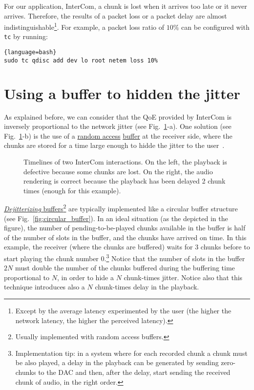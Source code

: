 For our application, InterCom, a chunk is lost when it arrives too
late or it never arrives. Therefore, the results of a packet loss or a
packet delay are almost indistinguishable\footnote{Except by the
  average latency experimented by the user (the higher the network
  latency, the higher the perceived latency).}. For example, a packet
loss ratio of $10\%$ can be configured with \verb|tc| by running:

  \begin{lstlisting}{language=bash}
sudo tc qdisc add dev lo root netem loss 10%
  \end{lstlisting}

\section{Using a buffer to hidden the jitter}

As explained before, we can consider that the QoE provided by InterCom
is inversely proportional to the network jitter (see
Fig.~\ref{fig:timelines}-a). One solution (see
Fig.~\ref{fig:timelines}-b) is the use of a
\href{https://en.wikipedia.org/wiki/Random_access}{random access}
\href{https://en.wikipedia.org/wiki/Data_buffer}{buffer} at the
receiver side, where the chunks are stored for a time large enough to
hidde the jitter to the user~\cite{Kurose-Ross}.

\begin{figure}
  \begin{center}
  \end{center}
  \caption{Timelines of two InterCom interactions. On the left, the
    playback is defective because some chunks are lost. On the right,
    the audio rendering is correct because the playback has been
    delayed 2 chunk times (enough for this example).}
  \label{fig:timelines}
\end{figure}

\href{https://en.wikipedia.org/wiki/Jitter#Jitter_buffers}{\emph{Dejitterizing}
  buffers}\footnote{Usually implemented with random access buffers.}
are typically implemented like a circular buffer structure (see
Fig.~\ref{fig:circular_buffer}). In an ideal situation (as the
depicted in the figure), the number of pending-to-be-played chunks
available in the buffer is half of the number of slots in the buffer,
and the chunks have arrived on time. In this example, the receiver
(where the chunks are buffered) waits for 3 chunks before to start
playing the chunk number 0.\footnote{Implementation tip: in a system
where for each recorded chunk a chunk must be also played, a delay in
the playback can be generated by sending zero-chunks to the DAC and
then, after the delay, start sending the received chunk of audio, in
the right order.} Notice that the number of slots in the buffer $2N$
must double the number of the chunks buffered during the buffering
time proportional to $N$, in order to hide a $N$ chunk-times
jitter. Notice also that this technique introduces also a $N$
chunk-times delay in the playback.


